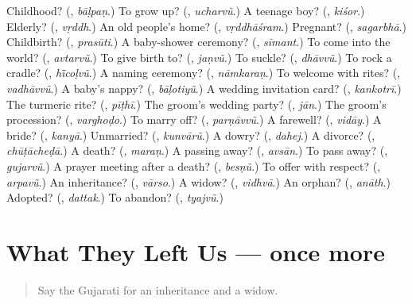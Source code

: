 \begin{tcolorbox}[breakable,colback=teal!4,colframe=teal!35!black,title={Before you move on}]
Childhood? (\textbf{}, \emph{bāḷpaṇ}.) To grow up? (\textbf{}, \emph{ucharvũ}.) A teenage boy? (\textbf{}, \emph{kiśor}.) Elderly? (\textbf{}, \emph{vṛddh}.) An old people's home? (\textbf{}, \emph{vṛddhāśram}.) Pregnant? (\textbf{}, \emph{sagarbhā}.) Childbirth? (\textbf{}, \emph{prasūti}.) A baby-shower ceremony? (\textbf{}, \emph{sīmant}.) To come into the world? (\textbf{}, \emph{avtarvũ}.) To give birth to? (\textbf{}, \emph{jaṇvũ}.) To suckle? (\textbf{}, \emph{dhāvvũ}.) To rock a cradle? (\textbf{}, \emph{hī̃coḷvũ}.) A naming ceremony? (\textbf{}, \emph{nāmkaraṇ}.) To welcome with rites? (\textbf{}, \emph{vadhāvvũ}.) A baby's nappy? (\textbf{}, \emph{bāḷotiyũ}.) A wedding invitation card? (\textbf{}, \emph{kankotrī}.) The turmeric rite? (\textbf{}, \emph{pīṭhī}.) The groom's wedding party? (\textbf{}, \emph{jān}.) The groom's procession? (\textbf{}, \emph{varghoḍo}.) To marry off? (\textbf{}, \emph{parṇāvvũ}.) A farewell? (\textbf{}, \emph{vidāy}.) A bride? (\textbf{}, \emph{kanyā}.) Unmarried? (\textbf{}, \emph{kunvārũ}.) A dowry? (\textbf{}, \emph{dahej}.) A divorce? (\textbf{}, \emph{chūṭācheḍā}.) A death? (\textbf{}, \emph{maraṇ}.) A passing away? (\textbf{}, \emph{avsān}.) To pass away? (\textbf{}, \emph{gujarvũ}.) A prayer meeting after a death? (\textbf{}, \emph{besṇũ}.) To offer with respect? (\textbf{}, \emph{arpavũ}.) An inheritance? (\textbf{}, \emph{vārso}.) A widow? (\textbf{}, \emph{vidhvā}.) An orphan? (\textbf{}, \emph{anāth}.) Adopted? (\textbf{}, \emph{dattak}.) To abandon? (\textbf{}, \emph{tyajvũ}.)
\end{tcolorbox}
\section[(dialogue)]{What They Left Us — once more}

\label{lesson:GU-R500-review-final-500}



\begin{quote}
Say the Gujarati for an inheritance and a widow.
\end{quote}

